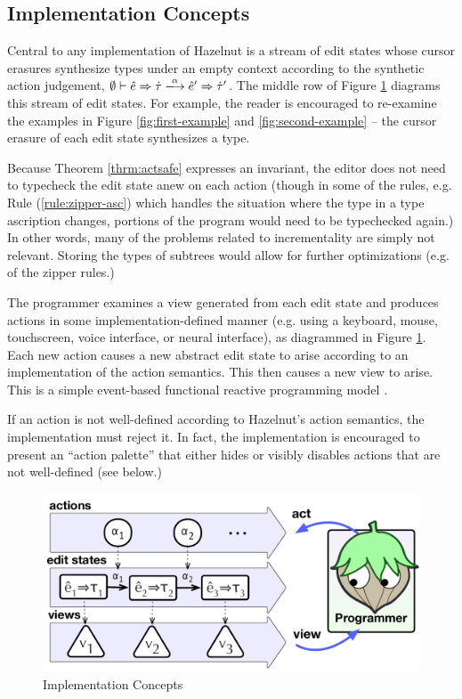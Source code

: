 \subsection{Implementation Concepts}
Central to any implementation of Hazelnut is a stream of edit states whose
cursor erasures synthesize types under an empty context according to the
synthetic action judgement,
$\performSyn{\emptyset}{\zexp}{\htau}{\alpha}{\zexp'}{\htau'}$. The middle
row of Figure \ref{fig:impl-overview} diagrams this stream of edit
states. For example, the reader is encouraged to re-examine the
examples in Figure \ref{fig:first-example} and \ref{fig:second-example} --
the cursor erasure of each edit state synthesizes a type.


Because Theorem \ref{thrm:actsafe} expresses an invariant, the editor does not need to
typecheck the edit state anew on each action (though in some of the rules, e.g. Rule
(\ref{rule:zipper-asc}) which handles the situation where the type in a
type ascription changes, portions of the program would need to be
typechecked again.) In other words, many of the problems related to incrementality 
are simply not relevant. Storing the types of subtrees would allow for further
optimizations (e.g. of the zipper rules.)

The programmer examines a view generated from each edit state and produces
actions in some implementation-defined manner (e.g. using a keyboard,
mouse, touchscreen, voice interface, or neural interface), as diagrammed in Figure \ref{fig:impl-overview}. Each new action
causes a new abstract edit state to arise according to an implementation of
the action semantics. This then causes a new view to arise. This is a
simple event-based functional reactive programming model
\cite{Wan:2000:FRP:349299.349331}.

If an action is not well-defined according to Hazelnut's action semantics,
the implementation must reject it. In fact, the implementation is
encouraged to present an ``action palette'' that either hides or visibly
disables actions that are not well-defined (see below.)

\begin{figure}
\centering
\includegraphics[width=\columnwidth]{impl-overview2}
\caption{Implementation Concepts}
\label{fig:impl-overview}
\end{figure}

